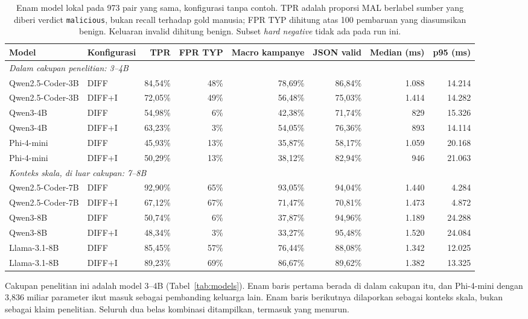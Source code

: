 \begin{table}[t]
\caption{Enam model lokal pada 973 pair yang sama, konfigurasi tanpa contoh.
TPR adalah proporsi MAL berlabel sumber yang diberi verdict
\texttt{malicious}, bukan recall terhadap gold manusia; FPR TYP dihitung atas
100 pembaruan yang diasumsikan benign. Keluaran invalid dihitung benign.
Subset \emph{hard negative} tidak ada pada run ini.}
\label{tab:baseline-models}
\centering
\begin{tabular}{llrrrrrr}
\toprule
Model & Konfigurasi & TPR & FPR TYP & Macro kampanye & JSON valid & Median (ms) & p95 (ms) \\
\midrule
\multicolumn{8}{l}{\emph{Dalam cakupan penelitian: 3--4B}} \\
Qwen2.5-Coder-3B & DIFF   & 84,54\% & 48\% & 78,69\% & 86,84\% & 1.088 & 14.214 \\
Qwen2.5-Coder-3B & DIFF+I & 72,05\% & 49\% & 56,48\% & 75,03\% & 1.414 & 14.282 \\
Qwen3-4B         & DIFF   & 54,98\% &  6\% & 42,38\% & 71,74\% &   829 & 15.326 \\
Qwen3-4B         & DIFF+I & 63,23\% &  3\% & 54,05\% & 76,36\% &   893 & 14.114 \\
Phi-4-mini       & DIFF   & 45,93\% & 13\% & 35,87\% & 58,17\% & 1.059 & 20.168 \\
Phi-4-mini       & DIFF+I & 50,29\% & 13\% & 38,12\% & 82,94\% &   946 & 21.063 \\
\midrule
\multicolumn{8}{l}{\emph{Konteks skala, di luar cakupan: 7--8B}} \\
Qwen2.5-Coder-7B & DIFF   & 92,90\% & 65\% & 93,05\% & 94,04\% & 1.440 &  4.284 \\
Qwen2.5-Coder-7B & DIFF+I & 67,12\% & 67\% & 71,47\% & 70,81\% & 1.473 &  4.872 \\
Qwen3-8B         & DIFF   & 50,74\% &  6\% & 37,87\% & 94,96\% & 1.189 & 24.288 \\
Qwen3-8B         & DIFF+I & 48,34\% &  3\% & 33,27\% & 95,48\% & 1.520 & 24.084 \\
Llama-3.1-8B     & DIFF   & 85,45\% & 57\% & 76,44\% & 88,08\% & 1.342 & 12.025 \\
Llama-3.1-8B     & DIFF+I & 89,23\% & 69\% & 86,67\% & 89,62\% & 1.382 & 13.325 \\
\bottomrule
\end{tabular}
\end{table}

Cakupan penelitian ini adalah model 3--4B (Tabel~\ref{tab:models}). Enam baris
pertama berada di dalam cakupan itu, dan Phi-4-mini dengan 3,836 miliar
parameter ikut masuk sebagai pembanding keluarga lain. Enam baris berikutnya
dilaporkan sebagai konteks skala, bukan sebagai klaim penelitian. Seluruh dua
belas kombinasi ditampilkan, termasuk yang menurun.

